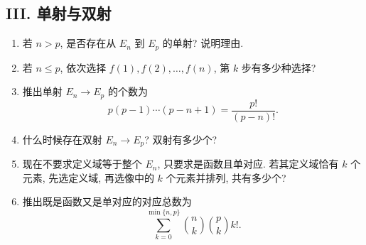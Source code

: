 \documentclass[usesamecnt, thmcnt=section, lang=cn, newtx, 10pt, scheme=chinese]{elegantbook}
\begin{document}
\subsection*{III. 单射与双射}
\begin{enumerate}[label=\textbf{\arabic*.}, resume=corr-count]
  \item 若 $n>p$, 是否存在从 $E_n$ 到 $E_p$ 的单射? 说明理由.
  \item 若 $n\leq p$, 依次选择 $f(1),f(2),\ldots,f(n)$, 第 $k$ 步有多少种选择?
  \item 推出单射 $E_n\to E_p$ 的个数为
  \[
   p(p-1)\cdots(p-n+1)=\frac{p!}{(p-n)!}.
  \]
  \item 什么时候存在双射 $E_n\to E_p$? 双射有多少个?
  \item 现在不要求定义域等于整个 $E_n$, 只要求是函数且单对应. 若其定义域恰有 $k$ 个元素, 先选定义域, 再选像中的 $k$ 个元素并排列, 共有多少个?
  \item 推出既是函数又是单对应的对应总数为
  \[
   \sum_{k=0}^{\min\{n,p\}}
   \binom{n}{k}\binom{p}{k}k!.
  \]
\end{enumerate}
\end{document}
